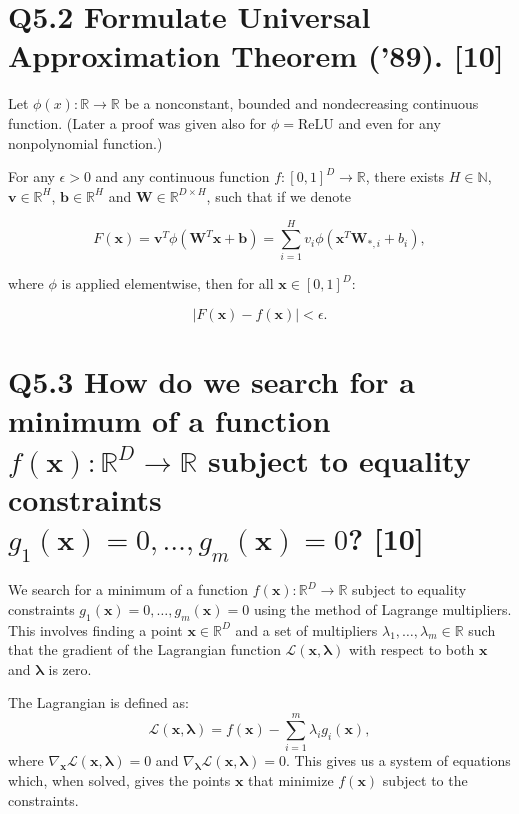 \documentclass[11pt]{article}
\begin{document}
\section{Q5.2 Formulate Universal Approximation Theorem ('89). [10]}

Let \(\phi(x) : \mathbb{R} \rightarrow \mathbb{R}\) be a nonconstant, bounded and nondecreasing continuous function. (Later a proof was given also for \(\phi = \text{ReLU}\) and even for any nonpolynomial function.)

For any \(\epsilon > 0\) and any continuous function \(f : [0, 1]^D \rightarrow \mathbb{R}\), there exists \(H \in \mathbb{N}\), \(\mathbf{v} \in \mathbb{R}^H\), \(\mathbf{b} \in \mathbb{R}^H\) and \(\mathbf{W} \in \mathbb{R}^{D \times H}\), such that if we denote

\[
F(\mathbf{x}) = \mathbf{v}^T \phi(\mathbf{W}^T \mathbf{x} + \mathbf{b}) = \sum_{i=1}^{H} v_i \phi(\mathbf{x}^T \mathbf{W}_{*,i} + b_i),
\]

where \(\phi\) is applied elementwise, then for all \(\mathbf{x} \in [0, 1]^D\):

\[
\left| F(\mathbf{x}) - f(\mathbf{x}) \right| < \epsilon.
\]

\section{Q5.3 How do we search for a minimum of a function $f(\mathbf{x}) : \mathbb{R}^D \rightarrow \mathbb{R}$ subject to equality constraints $g_1(\mathbf{x}) = 0, \ldots, g_m(\mathbf{x}) = 0$? [10]}

We search for a minimum of a function $f(\mathbf{x}) : \mathbb{R}^D \rightarrow \mathbb{R}$ subject to equality constraints $g_1(\mathbf{x}) = 0, \ldots, g_m(\mathbf{x}) = 0$ using the method of Lagrange multipliers. This involves finding a point $\mathbf{x} \in \mathbb{R}^D$ and a set of multipliers $\lambda_1, \ldots, \lambda_m \in \mathbb{R}$ such that the gradient of the Lagrangian function $\mathcal{L}(\mathbf{x}, \mathbf{\lambda})$ with respect to both $\mathbf{x}$ and $\mathbf{\lambda}$ is zero.

The Lagrangian is defined as:
\[
\mathcal{L}(\mathbf{x}, \mathbf{\lambda}) = f(\mathbf{x}) - \sum_{i=1}^{m} \lambda_i g_i(\mathbf{x}),
\]
where $\nabla_{\mathbf{x}}\mathcal{L}(\mathbf{x}, \mathbf{\lambda}) = 0$ and $\nabla_{\mathbf{\lambda}}\mathcal{L}(\mathbf{x}, \mathbf{\lambda}) = 0$. This gives us a system of equations which, when solved, gives the points $\mathbf{x}$ that minimize $f(\mathbf{x})$ subject to the constraints.
\end{document}
